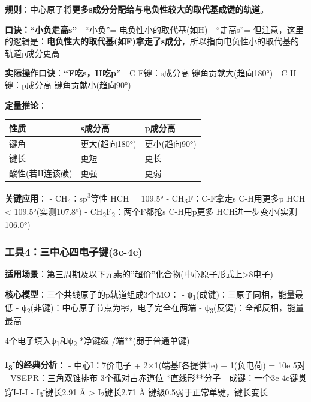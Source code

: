 \textbf{规则}：中心原子将\textbf{更多s成分分配给与电负性较大的取代基成键的轨道}。

\textbf{口诀：``小负走高s''}
- ``小负''= 电负性小的取代基(如H)
- ``走高s''= 但注意，这里的逻辑是：\textbf{电负性大的取代基(如F)拿走了s成分}，所以指向电负性小的取代基的轨道p成分更高

\textbf{实际操作口诀}：\textbf{``F吃s，H吃p''}
- C-F键：s成分高 \箭 键角贡献大(趋向180°)
- C-H键：p成分高 \箭 键角贡献小(趋向90°)

\textbf{定量推论}：

{\def\LTcaptype{none} %
\begin{longtable}[]{@{}lll@{}}
\toprule\noalign{}
性质 & s成分高 & p成分高 \\
\midrule\noalign{}
\endhead
\bottomrule\noalign{}
\endlastfoot
键角 & 更大(趋向180°) & 更小(趋向90°) \\
键长 & 更短 & 更长 \\
酸性(若H连该碳) & 更强 & 更弱 \\
\end{longtable}
}

\textbf{关键应用}：
- CH\textsubscript{4}：sp\textsuperscript{3}等性 \箭 HCH = 109.5°
- CH\textsubscript{3}F：C-F拿走s \箭 C-H用更多p \箭 HCH \textless{} 109.5°(实测107.8°)
- CH\textsubscript{2}F\textsubscript{2}：两个F都抢s \箭 C-H用p更多 \箭 HCH进一步变小(实测106.0°)

\subsubsection{工具4：三中心四电子键(3c-4e)}\label{ux5de5ux51774ux4e09ux4e2dux5fc3ux56dbux7535ux5b50ux952e3c-4e}

\textbf{适用场景}：第三周期及以下元素的''超价''化合物(中心原子形式上\textgreater8电子)

\textbf{核心模型}：三个共线原子的p轨道组成3个MO：
- ψ\textsubscript{1}(成键)：三原子同相，能量最低
- ψ\textsubscript{2}(非键)：中心原子节点为零，电子完全在两端
- ψ\textsubscript{3}(反键)：全部反相，能量最高

4个电子填入ψ\textsubscript{1}和ψ\textsubscript{2} \箭 **净键级 /端**(弱于普通单键)

\textbf{I\textsubscript{3}\textsuperscript{-}的经典分析}：
- 中心I：7价电子 + 2×1(端基I各提供1e) + 1(负电荷) = 10e \箭 5对
- VSEPR：三角双锥排布 \箭 3个孤对占赤道位 \箭 **直线形**分子
- 成键：一个3c-4e键贯穿I-I-I
- I\textsubscript{3}\textsuperscript{-}键长2.91 Å \textgreater{} I\textsubscript{2}键长2.71 Å \箭 键级0.5弱于正常单键，键长变长

